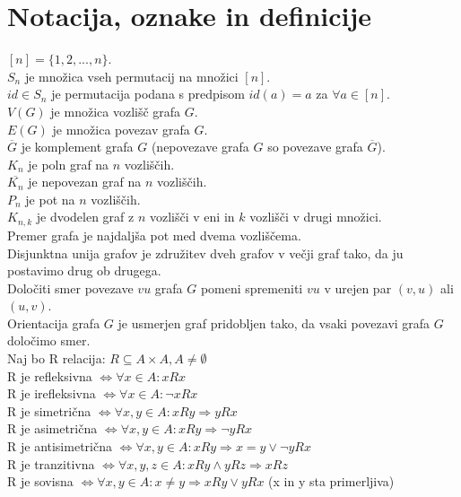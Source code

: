 \documentclass[a4paper, 12pt]{book}
\begin{document}
\chapter{ Notacija, oznake in definicije }
$[n] = \{ 1, 2,..., n\}$. \\
$S_n$ je množica vseh permutacij na množici $[n]$. \\
$id \in S_n$ je permutacija podana s predpisom $id(a) = a$ za $\forall a \in [n]$. \\
$V(G)$ je množica vozlišč grafa $G$. \\
$E(G)$ je množica povezav grafa $G$. \\
$\overline{G}$ je komplement grafa $G$ (nepovezave grafa $G$ so povezave grafa $\overline{G}$). \\
$K_n$ je poln graf na $n$ vozliščih. \\
$\overline{K_n}$ je nepovezan graf na $n$ vozliščih. \\
$P_n$ je pot na $n$ vozliščih. \\
$K_{n, k}$ je dvodelen graf z $n$ vozlišči v eni in $k$ vozlišči v drugi množici. \\
Premer grafa je najdaljša pot med dvema vozliščema. \\
Disjunktna unija grafov je združitev dveh grafov v večji graf tako, da ju postavimo drug ob drugega. \\
Določiti smer povezave $vu$ grafa $G$ pomeni spremeniti $vu$ v urejen par $(v, u)$ ali $(u, v)$. \\
Orientacija grafa $G$ je usmerjen graf pridobljen tako, da vsaki povezavi grafa $G$ določimo smer. \\
Naj bo R relacija: $ R\subseteq A\times A, A\neq\emptyset$ \\
R je refleksivna $\Leftrightarrow \forall x\in A: xRx$ \\
R je irefleksivna $\Leftrightarrow \forall x\in A: \neg xRx$ \\
R je simetrična $\Leftrightarrow \forall x,y\in A: xRy \Rightarrow yRx$ \\
R je asimetrična $\Leftrightarrow \forall x,y\in A: xRy \Rightarrow \neg yRx$ \\
R je antisimetrična $\Leftrightarrow \forall x,y\in A: xRy \Rightarrow x = y \lor \neg yRx$\\
R je tranzitivna $\Leftrightarrow \forall x,y,z\in A: xRy \land yRz \Rightarrow xRz$ \\
R je sovisna $\Leftrightarrow \forall x,y\in A: x \neq y \Rightarrow xRy \lor yRx $ (x in y sta primerljiva)\\
\end{document}
